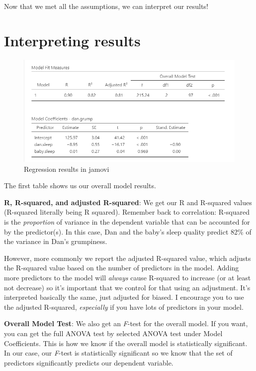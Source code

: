 \documentclass[
]{book}
\begin{document}
Now that we met all the assumptions, we can interpret our results!

\hypertarget{interpreting-results-8}{%
\section{Interpreting results}\label{interpreting-results-8}}

\begin{figure}

{\centering \includegraphics[width=1\linewidth]{images/13-regression/regression-results} 

}

\caption{Regression results in jamovi}\label{fig:unnamed-chunk-11}
\end{figure}

The first table shows us our overall model results.

\textbf{R, R-squared, and adjusted R-squared}: We get our R and R-squared values (R-squared literally being R squared). Remember back to correlation: R-squared is the \emph{proportion} of variance in the dependent variable that can be accounted for by the predictor(s). In this case, Dan and the baby's sleep quality predict 82\% of the variance in Dan's grumpiness.

However, more commonly we report the adjusted R-squared value, which adjusts the R-squared value based on the number of predictors in the model. Adding more predictors to the model will \emph{always} cause R-squared to increase (or at least not decrease) so it's important that we control for that using an adjustment. It's interpreted basically the same, just adjusted for biased. I encourage you to use the adjusted R-squared, \emph{especially} if you have lots of predictors in your model.

\textbf{Overall Model Test}: We also get an \emph{F}-test for the overall model. If you want, you can get the full ANOVA test by selected ANOVA test under Model Coefficients. This is how we know if the overall model is statistically significant. In our case, our \emph{F}-test is statistically significant so we know that the set of predictors significantly predicts our dependent variable.
\end{document}
